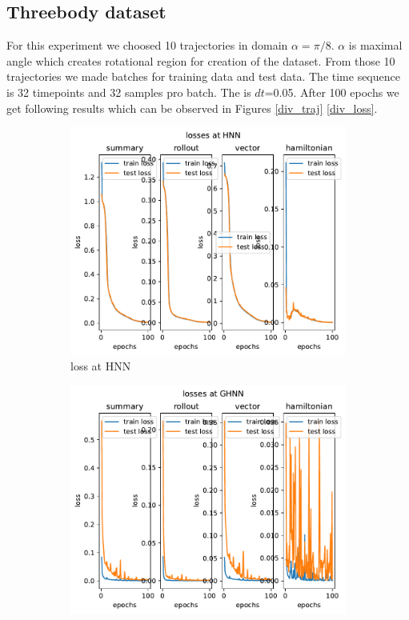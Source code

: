 \subsection{Threebody dataset}
For this experiment we choosed 10 trajectories in domain $\alpha= \pi/8$. $\alpha$
is maximal angle which creates rotational region for creation of the dataset. From those 10 trajectories we made batches for training data and test data. The time sequence is 32 timepoints and 32 samples pro batch. The is $dt$=0.05.
After 100 epochs we get following results which can be observed in Figures \ref{div_traj} \ref{div_loss}.
\begin{figure}[H]
	\centering
	\begin{subfigure}[b]{0.3\textwidth}
		\centering
		\includegraphics[width=\textwidth]{chapters/chapter5/figonly_hnn_loss.pdf}
		\caption{loss at HNN}
		\label{fig:image1}
	\end{subfigure}
	\hfill
	\begin{subfigure}[b]{0.3\textwidth}
		\centering
		\includegraphics[width=\textwidth]{chapters/chapter5/figonly_ghnn_loss.pdf}

\end{subfigure}
\end{figure}
